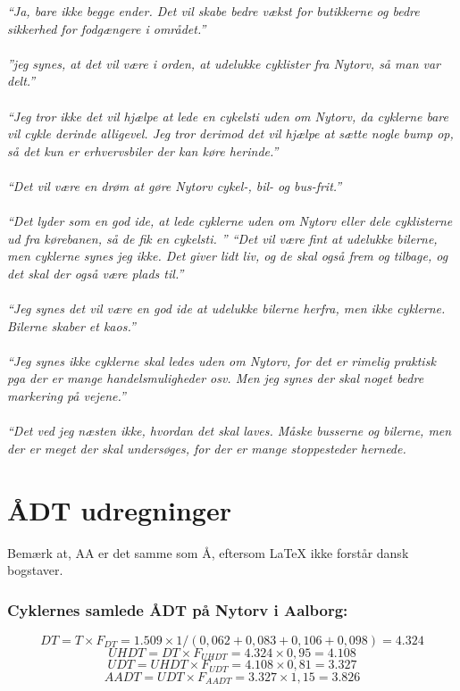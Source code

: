  \emph{“Ja, bare ikke begge ender. Det vil skabe bedre vækst for butikkerne og bedre sikkerhed for fodgængere i området.”}
~\\\\
  \emph{”jeg synes, at det vil være i orden, at udelukke cyklister fra Nytorv, så man var delt.”}
~\\\\
  \emph{“Jeg tror ikke det vil hjælpe at lede en cykelsti uden om Nytorv, da cyklerne bare vil cykle derinde alligevel. Jeg tror derimod det vil hjælpe at sætte nogle bump op, så det kun er erhvervsbiler der kan køre herinde.”}
~\\\\
  \emph{“Det vil være en drøm at gøre Nytorv cykel-, bil- og bus-frit.”}
~\\\\
  \emph{“Det lyder som en god ide, at lede cyklerne uden om Nytorv eller dele cyklisterne ud fra kørebanen, så de fik en cykelsti. ”
  “Det vil være fint at udelukke bilerne, men cyklerne synes jeg ikke. Det giver lidt liv, og de skal også frem og tilbage, og det skal der også være plads til.”}
~\\\\

  \emph{“Jeg synes det vil være en god ide at udelukke bilerne herfra, men ikke cyklerne. Bilerne skaber et kaos.”}
~\\\\
\emph{“Jeg synes ikke cyklerne skal ledes uden om Nytorv, for det er rimelig praktisk pga der er mange handelsmuligheder osv. Men jeg synes der skal noget bedre markering på vejene.”}
~\\\\
\emph{“Det ved jeg næsten ikke, hvordan det skal laves. Måske busserne og bilerne, men der er meget der skal undersøges, for der er mange stoppesteder hernede.}

\chapter{ÅDT udregninger}
  \label{chap:aadtregninger}
  Bemærk at, AA er det samme som Å, eftersom LaTeX ikke forstår dansk bogstaver.

\subsection{Cyklernes samlede ÅDT på Nytorv i Aalborg:}
\label{sub:samledeaadtcykel}
  $$DT = T \times F_{DT} = 1.509 \times 1/(0,062 + 0,083 + 0,106 + 0,098) = 4.324$$
  $$UHDT = DT \times F_{UHDT} = 4.324 \times 0,95 = 4.108$$
  $$UDT = UHDT \times F_{UDT} = 4.108 \times 0,81 = 3.327$$
  $$AADT = UDT \times F_{AADT} = 3.327 \times 1,15 = 3.826$$

